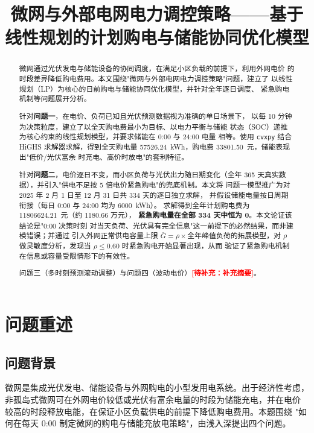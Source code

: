 \documentclass[withoutpreface,bwprint]{cumcmthesis}
\title{微网与外部电网电力调控策略——基于线性规划的计划购电与储能协同优化模型}
\newcommand{\TODO}[1]{\textcolor{red}{\textbf{[待补充：#1]}}}
\begin{document}
\maketitle

\begin{abstract}
微网通过光伏发电与储能设备的协同调度，在满足小区负载的前提下，利用外网电价
的时段差异降低购电费用。本文围绕"微网与外部电网电力调控策略"问题，建立了
以线性规划（LP）为核心的日前购电与储能协同优化模型，并针对全年逐日调度、
紧急购电机制等问题展开分析。

针对\textbf{问题一}，在电价、负荷已知且光伏预测数据视为准确的单日场景下，
以每 10 分钟为决策粒度，建立了以全天购电费最小为目标、以电力平衡与储能
状态（SOC）递推为核心约束的线性规划模型，并要求储能在 0:00 与 24:00 电量
相等。使用 \texttt{cvxpy} 结合 HiGHS 求解器求解，得到全天购电量
\num{57526.24}~kWh，购电费 \num{33801.50}~元，储能表现出"低价/光伏富余
时充电、高价时放电"的套利特征。

针对\textbf{问题二}，电价逐日不变，而小区负荷与光伏出力随日期变化（全年
365 天真实数据），并引入"供电不足按 5 倍电价紧急购电"的兜底机制。本文将
问题一模型推广为对 2025 年 2 月 1 日至 12 月 31 日共 334 天的逐日独立求解，
并假设储能电量按日周期衔接（每日 0:00 与 24:00 均为 \num{6000}~kWh）。
求解得到全年计划购电费为 \num{11806624.21}~元（约 1180.66 万元），
\textbf{紧急购电量在全部 334 天中恒为 0}。本文论证该结论是"0:00 决策时刻
对当天负荷、光伏具有完全信息"这一前提下的必然结果，而非建模错误；并通过
引入外网正常供电容量上限 $\bar G=\rho\times$全年峰值负荷的拓展模型，对
$\rho$ 做灵敏度分析，发现当 $\rho\le0.60$ 时紧急购电开始显著出现，从而
验证了紧急购电机制在信息或容量受限情形下的有效性。

问题三（多时刻预测滚动调整）与问题四（波动电价）\TODO{补充摘要}。

\end{abstract}

\tableofcontents

\section{问题重述}

\subsection{问题背景}
微网是集成光伏发电、储能设备与外网购电的小型发用电系统。出于经济性考虑，
非孤岛式微网可在外网电价较低或光伏有富余电量的时段为储能充电，并在电价
较高的时段释放电能，在保证小区负载供电的前提下降低购电费用。本题围绕
"如何在每天 0:00 制定微网的购电与储能充放电策略"，由浅入深提出四个问题。
\end{document}
